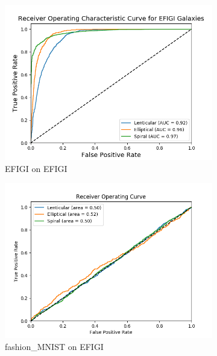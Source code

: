 \documentclass[12pt, onecolumn]{aa}
\begin{document}
\begin{figure}[t!]
  \begin{subfigure}[t]{0.5\linewidth}
    \includegraphics[width=\linewidth]{Figures/Results_ROC's/ROC_curves_E_on_E.png}
    \caption{ EFIGI on EFIGI}
    \label{fig:e_on_e}
  \end{subfigure}
  \begin{subfigure}[t]{0.5\linewidth}
    \includegraphics[width=\linewidth]{Figures/Results_ROC's/F_on_E.png} 
    \caption{ fashion\_MNIST on EFIGI} \label{fig:f_on_e}
  \end{subfigure} 
  \begin{subfigure}[t]{0.5\linewidth}

\end{subfigure}
\end{figure}
\end{document}

